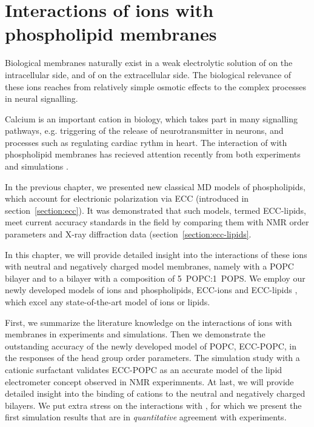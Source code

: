 \chapter{Interactions of ions with phospholipid membranes}
\label{chap:results}

Biological membranes naturally exist in a weak electrolytic solution of  on the intracellular side, and of  on the extracellular side. 
The biological relevance of these ions reaches from relatively simple osmotic effects to the complex processes in neural signalling. 

Calcium is an important cation in biology, 
which takes part in many signalling pathways, e.g. triggering of the release of neurotransmitter in neurons,
and processes such as regulating cardiac rythm in heart. 
The interaction of  with phospholipid membranes has recieved attention recently from both experiments and simulations \citep{melcrova16, javanainen17}.

In the previous chapter, we presented new classical MD models of phospholipids,
which account for electrionic polarization via ECC (introduced in section~\ref{section:ecc}). 
It was demonstrated that such models, termed ECC-lipids, 
meet current accuracy standards in the field 
by comparing them with NMR order parameters and X-ray diffraction data (section~\ref{section:ecc-lipids}. 

In this chapter, we will provide detailed insight into the interactions of these ions with neutral and negatively charged model membranes,
namely with a POPC bilayer and to a bilayer with a composition of 5~POPC:1~POPS. 
We employ our newly developed models of ions and phospholipids, 
ECC-ions \citep{martinek17, kohagen16, Pluharova2014} and ECC-lipids \citep{melcr18}, 
which excel any state-of-the-art model of ions or lipids. 

First, we summarize the literature knowledge on the interactions of ions with membranes in experiments and simulations.
Then we demonstrate the outstanding accuracy of the newly developed model of POPC, ECC-POPC, 
in the responses of the head group order parameters.
The simulation study with a cationic surfactant 
validates ECC-POPC as an accurate model of the lipid electrometer concept observed in NMR experimnents. 
At last, we will provide detailed insight into the binding of cations to the neutral and negatively charged bilayers. 
We put extra stress on the interactions with , 
for which we present the first simulation results that are in \emph{quantitative} agreement with experiments. \citep{catte16, melcr18}






